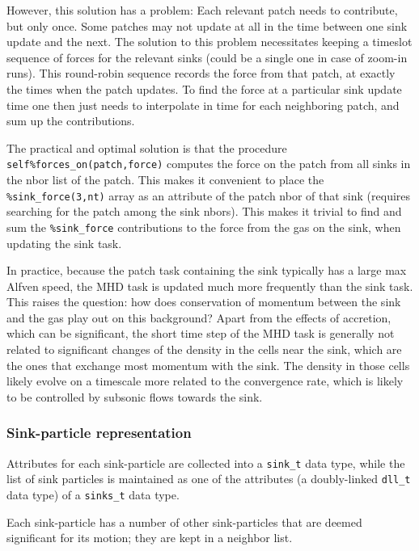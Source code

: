 \documentclass[paper=a4,fontsize=11pt]{scrartcl}
\numberwithin{equation}{section}		%
\numberwithin{figure}{section}			%
\numberwithin{table}{section}				%
\newcommand{\codecolor}{\color{Blue}}
\newcommand{\Code}[1]{{\codecolor\texttt{#1}}}
\begin{document}
However, this solution has a problem:  Each relevant patch needs to contribute, but only once.  Some patches may not update at all in the time between one sink update and the next.   The solution to this problem necessitates keeping a timeslot sequence of forces for the relevant sinks (could be a single one in case of zoom-in runs).  This round-robin sequence records the force from that patch, at exactly the times when the patch updates.  To find the force at a particular sink update time one then just needs to interpolate in time for each neighboring patch, and sum up the contributions.

The practical and optimal solution is that the procedure \verb|self%forces_on(patch,force)| computes the force on the patch from all sinks in the nbor list of the patch.  This makes it convenient to place the \verb|%sink_force(3,nt)| array as an attribute of the patch nbor of that sink (requires searching for the patch among the sink nbors).  This makes it trivial to find and sum the \verb|%sink_force| contributions to the force from the gas on the sink, when updating the sink task.

In practice, because the patch task containing the sink typically has a large max Alfven speed, the MHD task is updated much more frequently than the sink task.  This raises the question: how does conservation of momentum between the sink and the gas play out on this background?   Apart from the effects of accretion, which can be significant, the short time step of the MHD task is generally not related to significant changes of the density in the cells near the sink, which are the ones that exchange most momentum with the sink.  The density in those cells likely evolve on a timescale more related to the convergence rate, which is likely to be controlled by subsonic flows towards the sink.

\subsubsection{Sink-particle representation}

Attributes for each sink-particle are collected into a \Code{sink\_t} data type, while the list of sink particles is maintained as one of the attributes (a doubly-linked \Code{dll\_t} data type) of a \Code{sinks\_t} data type.

Each sink-particle has a number of other sink-particles that are deemed significant for its motion; they are kept in a neighbor list.
\end{document}
